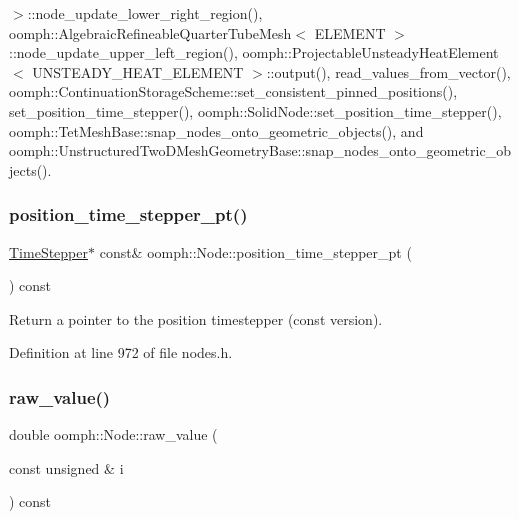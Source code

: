 $>$\+::node\+\_\+update\+\_\+lower\+\_\+right\+\_\+region(), oomph\+::\+Algebraic\+Refineable\+Quarter\+Tube\+Mesh$<$ E\+L\+E\+M\+E\+N\+T $>$\+::node\+\_\+update\+\_\+upper\+\_\+left\+\_\+region(), oomph\+::\+Projectable\+Unsteady\+Heat\+Element$<$ U\+N\+S\+T\+E\+A\+D\+Y\+\_\+\+H\+E\+A\+T\+\_\+\+E\+L\+E\+M\+E\+N\+T $>$\+::output(), read\+\_\+values\+\_\+from\+\_\+vector(), oomph\+::\+Continuation\+Storage\+Scheme\+::set\+\_\+consistent\+\_\+pinned\+\_\+positions(), set\+\_\+position\+\_\+time\+\_\+stepper(), oomph\+::\+Solid\+Node\+::set\+\_\+position\+\_\+time\+\_\+stepper(), oomph\+::\+Tet\+Mesh\+Base\+::snap\+\_\+nodes\+\_\+onto\+\_\+geometric\+\_\+objects(), and oomph\+::\+Unstructured\+Two\+D\+Mesh\+Geometry\+Base\+::snap\+\_\+nodes\+\_\+onto\+\_\+geometric\+\_\+objects().

\mbox{\label{classoomph_1_1Node_a5719b9f80b4ca590d2d875dbf83fd342}} 
\subsubsection{\texorpdfstring{position\+\_\+time\+\_\+stepper\+\_\+pt()}{position\_time\_stepper\_pt()}\hspace{0.1cm}{\footnotesize\ttfamily [2/2]}}
{\footnotesize\ttfamily \hyperlink{classoomph_1_1TimeStepper}{Time\+Stepper}$\ast$ const\& oomph\+::\+Node\+::position\+\_\+time\+\_\+stepper\+\_\+pt (\begin{DoxyParamCaption}{ }\end{DoxyParamCaption}) const\hspace{0.3cm}{\ttfamily [inline]}}



Return a pointer to the position timestepper (const version). 



Definition at line 972 of file nodes.\+h.

\mbox{\label{classoomph_1_1Node_abc9f54df56cbe8eedc6f1595c7d7f11e}} 
\subsubsection{\texorpdfstring{raw\+\_\+value()}{raw\_value()}\hspace{0.1cm}{\footnotesize\ttfamily [1/2]}}
{\footnotesize\ttfamily double oomph\+::\+Node\+::raw\+\_\+value (\begin{DoxyParamCaption}\item[{const unsigned \&}]{i }\end{DoxyParamCaption}) const\hspace{0.3cm}{\ttfamily [inline]}}



